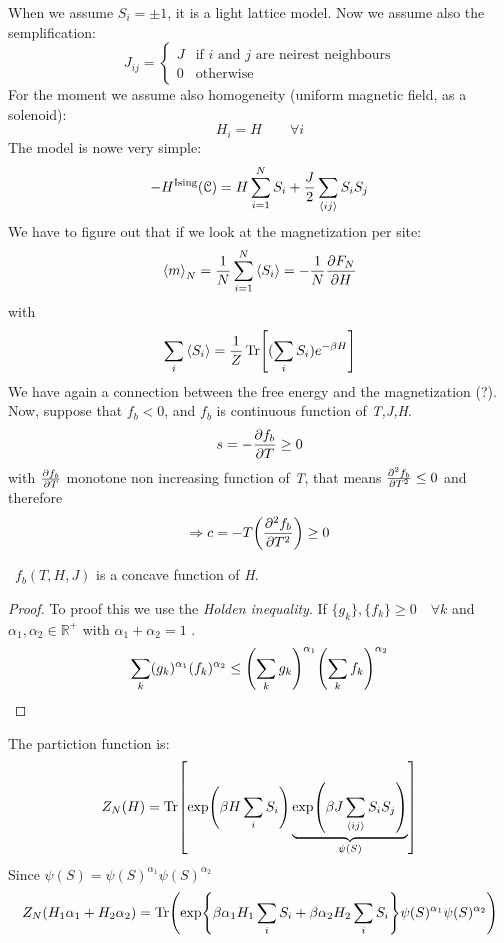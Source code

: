 \documentclass[../main/main.tex]{subfiles}
\begin{document}
When we assume \( S_i = \pm 1 \), it is a light lattice model.
Now we assume also the semplification:
\begin{equation}
J_{ij} =
  \begin{cases}
  J & \text{if } i \text{ and } j \text{ are neirest neighbours} \\
  0 & \text{otherwise}
  \end{cases}
\end{equation}
For the moment we assume also homogeneity (uniform magnetic field, as a solenoid):
\begin{equation}
  H_i = H \qquad \forall i
\end{equation}
The model is nowe very simple:
\begin{equation}
  -H^{\text{Ising}} (\mathcal{C}) = H\sum_{i=1}^{N} S_i  + \frac{J}{2} \sum_{\expval{ij} }^{}   S_i S_j
\end{equation}
We have to figure out that if we look at the magnetization per site:
\begin{equation}
  \expval{m}_N = \frac{1}{N} \sum_{i=1}^{N} \expval{S_i} = - \frac{1}{N} \pdv{F_N}{H}
\end{equation}
with
\begin{equation}
  \sum_i \expval{S_i} = \frac{1}{Z} \Tr[(\sum_{i}^{} S_i  )e^{-\beta H} ]
\end{equation}
We have again a connection between the free energy and the magnetization (?).
Now, suppose that \( f_b < 0 \), and \( f_b \) is continuous function of \emph{T,J,H}.
\begin{equation}
  s = - \pdv{f_b}{T} \ge 0
\end{equation}
with \( \pdv{f_b}{T} \) monotone non increasing function of \emph{T}, that means \( \pdv[2]{f_b}{T} \le 0 \) and therefore
\begin{equation}
  \Rightarrow c = - T \qty(\pdv[2]{f_b}{T}) \ge 0
\end{equation}
\begin{theorem}[] \
\( f_b (T,H,J) \) is a concave function of \emph{H}.
\end{theorem}
\begin{proof}
To proof this we use the \emph{Holden inequality}. If \( \{g_k\},\{f_k\} \ge 0 \quad \forall k\)  and \( \alpha _1, \alpha _2 \in \mathbb{R}^+ \) with \( \alpha _1 + \alpha _2 = 1 \) .
\begin{equation}
  \sum_{k}^{} (g_k)^{\alpha _1} (f_k)^{\alpha _2} \le \qty(\sum_{k}^{} g_k  )^{\alpha _1} \qty(\sum_{k}^{} f_k  )^{\alpha _2}
\end{equation}

\end{proof}
The partiction function is:
\begin{equation}
  Z_N (H) = \Tr[\exp (\beta H \sum_{i}^{} S_i ) \underbrace{\exp (\beta J \sum_{\expval{ij} }^{} S_i S_j ) }_{\psi (S)}  ]
\end{equation}
Since \( \psi (S) = \psi (S)^{\alpha _1} \psi (S)^{\alpha _2} \)
\begin{equation}
  Z_N (H_1 \alpha _1 + H_2 \alpha _2) = \Tr(\exp {\beta \alpha _1 H_1 \sum_{i}^{} S_i + \beta \alpha _2 H_2 \sum_{i}^{} S_i} \psi (S)^{\alpha _1} \psi (S)^{\alpha _2})
\end{equation}
\end{document}
